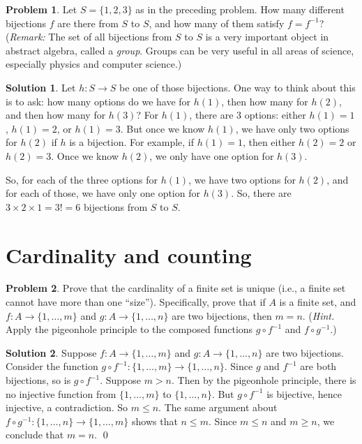 \documentclass{article}
\numberwithin{equation}{section}
\theoremstyle{plain}
\theoremstyle{definition}
\newtheorem{problem}{Problem}
\newtheorem*{solution*}{Solution}
\begin{document}
\begin{problem}
	Let $S = \{1,2,3\}$ as in the preceding problem. How many different bijections $f$ are there from $S$ to $S$, and how many of them satisfy $f = f^{-1}$? (\emph{Remark:} The set of all bijections from $S$ to $S$ is a very important object in abstract algebra, called a \emph{group}. Groups can be very useful in all areas of science, especially physics and computer science.)
\end{problem}

\begin{solution*}
	Let $h : S \to S$ be one of those bijections. One way to think about this is to ask: how many options do we have for $h(1)$, then how many for $h(2)$, and then how many for $h(3)$? For $h(1)$, there are 3 options: either $h(1) = 1$, $h(1) = 2$, or $h(1) = 3$. But once we know $h(1)$, we have only two options for $h(2)$ if $h$ is a bijection. For example, if $h(1) = 1$, then either $h(2) = 2$ or $h(2) = 3$. Once we know $h(2)$, we only have one option for $h(3)$. 
	
	So, for each of the three options for $h(1)$, we have two options for $h(2)$, and for each of those, we have only one option for $h(3)$. So, there are $3 \times 2 \times 1 = 3! = 6$ bijections from $S$ to $S$. 
\end{solution*}

\section*{Cardinality and counting}

\begin{problem}
	Prove that the cardinality of a finite set is unique (i.e., a finite set cannot have more than one ``size''). Specifically, prove that if $A$ is a finite set, and $f : A \to \{1,\ldots, m\}$ and $g : A \to \{1, \ldots, n\}$ are two bijections, then $m = n$. (\emph{Hint.} Apply the pigeonhole principle to the composed functions $g \circ f^{-1}$ and $f \circ g^{-1}$.)
\end{problem}

\begin{solution*}
	Suppose $f : A \to \{1,\ldots, m\}$ and $g : A \to \{1, \ldots, n\}$ are two bijections. Consider the function $g \circ f^{-1} : \{1, \ldots, m\} \to \{1, \ldots, n\}$. Since $g$ and $f^{-1}$ are both bijections, so is $g \circ f^{-1}$. Suppose $m > n$. Then by the pigeonhole principle, there is no injective function from $\{1,\ldots, m\}$ to $\{1,\ldots, n\}$. But $g \circ f^{-1}$ is bijective, hence injective, a contradiction. So $m \leq n$. The same argument about $f \circ g^{-1} : \{1, \ldots, n\} \to \{1, \ldots, m\}$ shows that $n \leq m$. Since $m \leq n$ and $m \geq n$, we conclude that $m=n$. \qed
\end{solution*}
\end{document}
